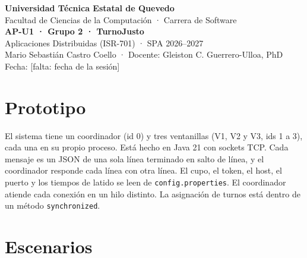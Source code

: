 \documentclass[11pt,a4paper]{article}
\begin{document}
\begin{center}
  {\large\bfseries Universidad Técnica Estatal de Quevedo}\\[2pt]
  Facultad de Ciencias de la Computación · Carrera de Software\\[6pt]
  {\Large\bfseries AP-U1 · Grupo 2 · TurnoJusto}\\[2pt]
  Aplicaciones Distribuidas (ISR-701) · SPA 2026--2027\\[6pt]
  Mario Sebastián Castro Coello · Docente: Gleiston C. Guerrero-Ulloa, PhD\\
  Fecha: [falta: fecha de la sesión]
\end{center}

\section{Prototipo}

El sistema tiene un coordinador (id 0) y tres ventanillas (V1, V2 y V3, ids 1 a 3), cada una en su propio proceso. Está hecho en Java 21 con sockets TCP. Cada mensaje es un JSON de una sola línea terminado en salto de línea, y el coordinador responde cada línea con otra línea. El cupo, el token, el host, el puerto y los tiempos de latido se leen de \texttt{config.properties}. El coordinador atiende cada conexión en un hilo distinto. La asignación de turnos está dentro de un método \texttt{synchronized}.

\section{Escenarios}
\end{document}
